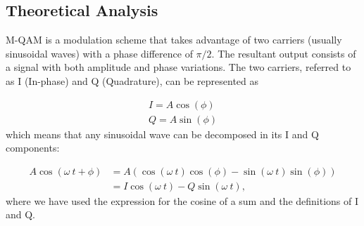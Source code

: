 
\subsection{Theoretical Analysis}

M-QAM is a modulation scheme that takes advantage of two carriers (usually sinusoidal waves) with a phase difference of $\pi/2$. The resultant output consists of a signal with both amplitude and phase variations. The two carriers, referred to as I (In-phase) and Q (Quadrature), can be represented as

\begin{align}
	I=A\cos(\phi) \\
	Q=A\sin(\phi)
\end{align}
which means that any sinusoidal wave can be decomposed in its I and Q components:

\begin{align}
	A\cos(\omega~t+\phi)&=A\left(\cos(\omega~t)\cos(\phi)-\sin(\omega~t)\sin(\phi)\right) \\
	&=I\cos(\omega~t)-Q\sin(\omega~t),
\end{align}
where we have used the expression for the cosine of a sum and the definitions of I and Q.

